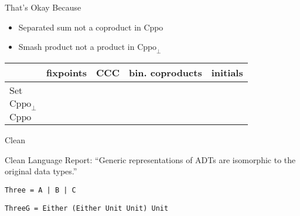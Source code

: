 \documentclass{beamer}
\newcommand{\cmark}{\ding{51}}
\newcommand{\xmark}{\ding{55}}
\newcommand{\Cppo}{\text{Cppo}}
\begin{document}
\begin{frame}[fragile]{That's Okay Because}

\begin{itemize}
\item Separated sum not a coproduct in $\Cppo$
\item Smash product not a product in $\Cppo_\bot$
\end{itemize}
\vspace{1em}

\begin{center}
\begin{tabular}{l|c|c|c|c}
{}           & fixpoints & CCC    & bin. coproducts & initials \\ \hline
Set          & \xmark    & \cmark & \cmark          & \cmark   \\ \hline
$\Cppo_\bot$ & \cmark    & \xmark & \cmark          & \cmark   \\ \hline
$\Cppo$      & \cmark    & \cmark & \xmark          & \xmark   \\
\end{tabular}
\end{center}

\end{frame}



\begin{frame}[fragile]{Clean}

Clean Language Report: ``Generic representations of ADTs are isomorphic to the original data types.''

\texttt{Three = A | B | C}


\texttt{ThreeG = Either (Either Unit Unit) Unit}


\end{frame}
\end{document}
